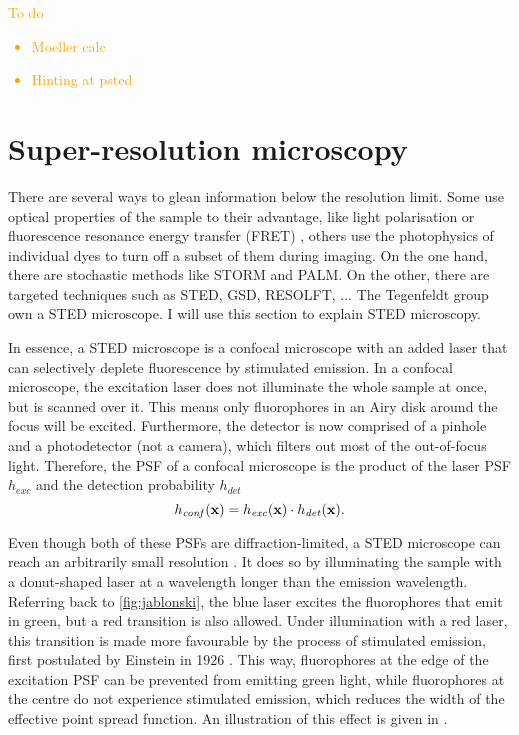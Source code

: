 \textcolor{orange}{
To do 
\begin{itemize}
	\item Moeller calc	
	\item Hinting at psted
\end{itemize}
}

\section{Super-resolution microscopy}

There are several ways to glean information below the resolution limit. Some use optical properties of the sample to their advantage, like light polarisation or fluorescence resonance energy transfer (FRET) \cite{Lerner2021}, others use the photophysics of individual dyes to turn off a subset of them during imaging.  On the one hand, there are stochastic methods like STORM and PALM. On the other, there are targeted techniques such as STED, GSD, RESOLFT, ...  The Tegenfeldt group own a STED microscope. I will use this section to explain STED microscopy.

In essence, a STED microscope is a confocal microscope with an added laser that can selectively deplete fluorescence by stimulated emission.  In a confocal microscope, the excitation laser does not illuminate the whole sample at once, but is scanned over it. This means only fluorophores in an Airy disk around the focus will be excited. Furthermore, the detector is now comprised of a pinhole and a photodetector (not a camera), which filters out most of the out-of-focus light. Therefore, the PSF of a confocal microscope is the product of the laser PSF $ h_\mathit{exc} $ and the detection probability $ h_\mathit{det} $
\begin{equation}
	h_\mathit{conf}(\vb{x}) = h_\mathit{exc}(\vb{x}) \cdot h_\mathit{det}(\vb{x}).
\end{equation}

Even though both of these PSFs are diffraction-limited, a STED microscope can reach an arbitrarily small resolution \cite{Wildanger2012}. It does so by illuminating the sample with a donut-shaped laser at a wavelength longer than the emission wavelength. Referring back to \autoref{fig:jablonski}, the blue laser excites the fluorophores that emit in green, but a red transition is also allowed. Under illumination with a red laser, this transition is made more favourable by the process of stimulated emission, first postulated by Einstein in 1926 \cite{Einstein1926}. This way, fluorophores at the edge of the excitation PSF can be prevented from emitting green light, while fluorophores at the centre do not experience stimulated emission, which reduces the width of the effective point spread function. An illustration of this effect is given in .

